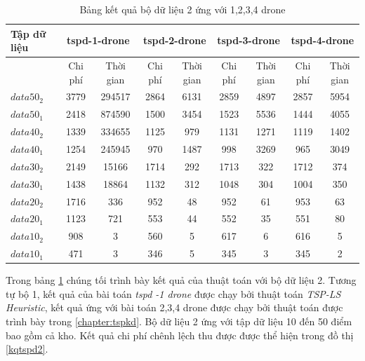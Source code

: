 \documentclass[a4paper,12pt]{report}
\begin{document}
\footnotesize
\begin{longtable}{|l|c|c|c|c|c|c|c|c|}
\caption{Bảng kết quả bộ dữ liệu 2 ứng với 1,2,3,4 drone}
\label{tabletspkd1}\\
\toprule
\multirow{2}{*}{Tập dữ liệu} & \multicolumn{2}{c|}{tspd-1-drone } &\multicolumn{2}{c|}{tspd-2-drone } &\multicolumn{2}{c|}{tspd-3-drone }&\multicolumn{2}{c|}{tspd-4-drone } \\
\hline 
&Chi phí &Thời gian&Chi phí &Thời gian&Chi phí &Thời gian&Chi phí &Thời gian\\
\midrule
        \toprule
$data 50_2$ & 3779 & 294517
& 2864 &6131
&2859 &4897
&2857 &5954 \\
\hline
$data 50_1$&2418& 874590
&1500& 3454
&1523& 5536
&1444& 4055 \\
\hline
$data 40_2$&1339& 334655
&1125& 979
&1131& 1271
&1119 &1402 \\
\hline
$data 40_1$&1254& 245945
&970& 1487
&998&  3269
&965& 3049 \\
\hline

$data 30_2$&2149& 15166
&1714& 292
&1713& 322
&1712& 374 \\
\hline
$data 30_1$&1438& 18864
&1132& 312
&1048& 304
&1004& 350 \\
\hline
$data 20_2$&1716&  336
&952& 48
&952& 61
&953& 63 \\
\hline
$data 20_1$&1123& 721
&553& 44
&552& 35
&551& 80\\
\hline
$data 10_2$&908& 3
&560& 5
&617& 6
&616& 5 \\
\hline
$data 10_1$&471& 3
&346& 5
&345& 3
&345& 2\\
\hline
\end{longtable}
\normalsize
Trong bảng \ref{tabletspkd1} chúng tối trình bày kết quả của thuật toán với bộ dữ liệu 2. Tương tự bộ 1, kết quả của bài toán \textit{tspd -1 drone } được chạy bởi thuật toán \textit{TSP-LS Heuristic}, kết quả ứng với bài toán 2,3,4 drone được chạy bởi thuật toán được trình bày trong \ref{chapter:tspkd}. Bộ dữ liệu 2 ứng với tập dữ liệu 10 đến 50 điểm bao gồm cả kho. Kết quả chi phí chênh lệch thu được được thể hiện trong đồ thị \ref{kqtspd2}.
\end{document}
